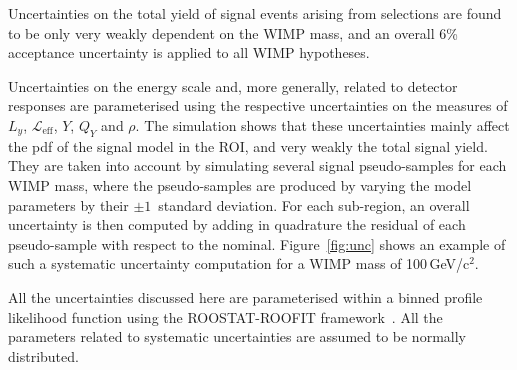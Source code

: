 Uncertainties on the total yield of signal events arising from selections are found to be only very weakly dependent on 
the WIMP mass, and an overall 6\% acceptance uncertainty is applied to all WIMP hypotheses. 

Uncertainties on the energy scale and, more generally, related to detector responses  are parameterised 
using the respective uncertainties on the measures of $L_y$, $\mathcal{L}_{\text{eff}}$, $Y$, $Q_Y$ and $\rho$. The simulation shows 
that these uncertainties mainly affect the pdf of the signal model in the ROI, and very weakly the total signal yield. 
They are taken into account by simulating several signal pseudo-samples for each WIMP mass, where the pseudo-samples are produced 
by varying the model parameters by their $\pm 1$~standard deviation. 
For each sub-region, an overall uncertainty is then computed by adding in quadrature the residual of each pseudo-sample 
with respect to the nominal. Figure~\ref{fig:unc} shows an example of such a systematic uncertainty computation for a WIMP mass of 100\,GeV/c$^2$.


All the uncertainties discussed here are parameterised within a binned profile likelihood function using the ROOSTAT-ROOFIT framework~\cite{roostat,roofit}.
All the parameters related to systematic uncertainties are assumed to be normally distributed.


















